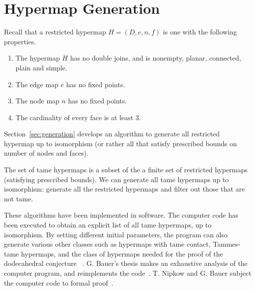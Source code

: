 \section{Hypermap Generation}\label{sec:hyper-gener}

Recall that a restricted hypermap  $H = (D,e,n,f)$ is one with the following
properties.
\begin{enumerate}
\item The hypermap $H$ has no double joins, and is nonempty, planar,
  connected, plain and simple.
\item The edge map $e$ has no fixed points.  %
\item The node map $n$ has no fixed points.
\item The cardinality of every face is at least $3$.
\end{enumerate}

Section~\ref{sec:generation} develops an algorithm to generate all
restricted hypermap up to isomorphism (or rather all that satisfy
prescribed bounds on number of nodes and faces).

The set of tame hypermaps is a subset of the a finite set of
restricted hypermaps (satisfying prescribed bounds).  We can generate
all tame hypermaps up to isomorphism: generate all the restricted
hypermaps and filter out those that are not tame.

These algorithms have been implemented in software.  The computer code
has been executed to obtain an explicit list of all tame hypermaps, up
to isomorphism.  By setting different initial parameters, the program
can also generate various other classes such as hypermaps with tame
contact, Tammes-tame hypermaps, and the class of hypermaps needed for
the proof of the dodecahedral conjecture
~\cite{unknown}. %
G. Bauer's thesis makes an exhaustive analysis of the computer
program, and reimplements the code~\cite{unknown}.  T. Nipkow and G.
Bauer subject the computer code to formal proof~\cite{unknown}.



